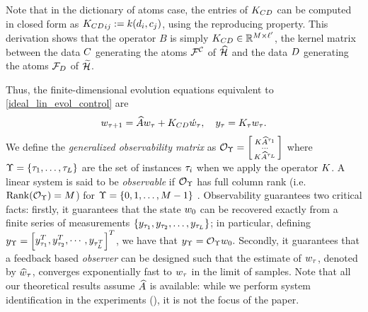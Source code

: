 Note that in the dictionary of atoms case, the entries of $K_{CD}$ can be computed in closed form as ${K_{CD}}_{ij}:= k(d_i, c_j)$,
using the reproducing property. 
This derivation shows that the operator $B$ is simply $K_{CD}\in\mathbb{R}^{M\times\ell'}$, the kernel matrix between the data $C$ generating the atoms $\mathcal{F}^{\mathcal{C}}$ of $\widehat{\mathcal{H}}$ and the data $D$ generating the atoms $\mathcal{F}_{D}$ of $\widetilde{\mathcal{H}}$. 

Thus, the finite-dimensional evolution equations equivalent to \eqref{ideal_lin_evol_control} are
\begin{align}
 \weight_{\tindex+1} = \dualopApprox\weight_{\tindex} + \empKCD\weightc_{\tindex}, \quad
 y_{\tindex} = \empK_{\tindex} w_{\tindex} \eqlabel{k_measure_c1}.
\end{align}
We define the \emph{generalized observability matrix} \cite{zhou:bk:96} as 
$  \mathcal{O}_{\Upsilon} = 
 \left[
 \begin{smallmatrix}
  K \widehat{A}^{\tau_1}\\
  \cdots\\
  K \widehat{A}^{\tau_L}
 \end{smallmatrix}
 \right] $ 
where $\Upsilon = \{\tau_1, \dots, \tau_{L}\}$ are the set of instances $\tau_i$
when we apply the operator $K$. A linear system is said to be \emph{observable} if $\mathcal{O}_{\Upsilon}$ has full column rank (i.e. $\mathrm{Rank} (\mathcal{O}_{\Upsilon})=M$) for 
$\Upsilon = \{0, 1, \dots, M-1\}$ \cite{zhou:bk:96}. Observability guarantees two critical facts: firstly, it guarantees that the state $w_0$ can be recovered exactly from a finite series of measurements $\{y_{{\tau}_1}, y_{{\tau}_2}, \dots, y_{{\tau}_{L}}\}$; in particular, defining $y_{\Upsilon} = \begin{bmatrix}y_{{\tau}_1}^T, y_{{\tau}_2}^T, \cdots, y_{{\tau}_{L}^T}\end{bmatrix}^T$, we have that $y_{\Upsilon} = \mathcal{O}_{\Upsilon}w_0.$  Secondly, it guarantees that a feedback based \emph{observer} can be designed such that the estimate of $w_{\tau}$, denoted by $\widehat{w}_{\tau}$, converges exponentially fast to $w_{\tau}$ in the limit of samples. Note that all our theoretical results assume $\widehat{A}$ is available: while we perform system identification in the experiments (\cite{Kingravi16_NIPS}), it is not the focus of the paper. 

